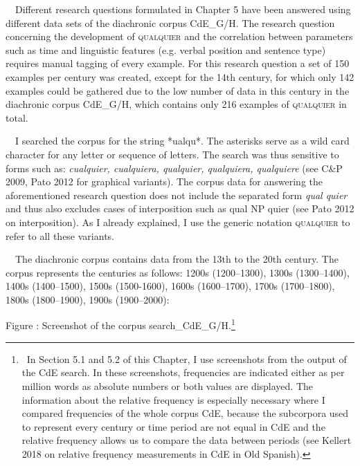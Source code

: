 \begin{styleStandard}
\ \ Different research questions formulated in Chapter 5 have been answered using different data sets of the diachronic corpus CdE\_G/H. The research question concerning the development of \textsc{qualquier} and the correlation between parameters such as time and linguistic features (e.g. verbal position and sentence type) requires manual tagging of every example. For this research question a set of 150 examples per century was created, except for the 14th century, for which only 142 examples could be gathered due to the low number of data in this century in the diachronic corpus CdE\_G/H, which contains only 216 examples of \textsc{qualquier} in total\textsc{. }
\end{styleStandard}

\begin{styleStandard}
\ \ I searched the corpus for the string *ualqu*. The asterisks serve as a wild card character for any letter or sequence of letters. The search was thus sensitive to forms such as: \textit{cualquier, cualquiera, qualquier, qualquiera, qualquiere }(see C\&P 2009, Pato 2012 for graphical variants). The corpus data for answering the aforementioned research question does not include the separated form \textit{qual quier} and thus also excludes cases of interposition such as qual NP quier (see Pato 2012 on interposition). As I already explained, I use the generic notation \textsc{qualquier} to refer to all these variants. 
\end{styleStandard}

\begin{styleStandard}
\ \ The diachronic corpus contains data from the 13th to the 20th century. The corpus represents the centuries as follows: 1200s (1200–1300), 1300s (1300–1400), 1400s (1400–1500), 1500s (1500-1600), 1600s (1600–1700), 1700s (1700–1800), 1800s (1800–1900), 1900s (1900–2000):
\end{styleStandard}

\begin{styleStandard}
Figure : Screenshot of the corpus search\_CdE\_G/H.\footnote{\textrm{\ In Section 5.1 and 5.2 of this Chapter, I use screenshots from the output of the CdE search. In these screenshots, frequencies are indicated either as per million words as absolute numbers or both values are displayed. The information about the relative frequency is especially necessary where I compared frequencies of the whole corpus CdE, because the subcorpora used to represent every century or time period are not equal in CdE and the relative frequency allows us to compare the data between periods (see Kellert 2018 on relative frequency measurements in CdE in Old Spanish).}}
\end{styleStandard}

